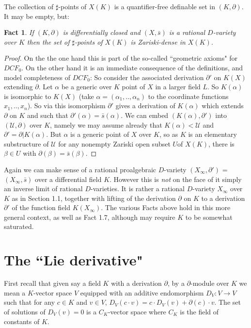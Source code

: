\documentclass[12pt]{article}
\newtheorem{Fact}[Theorem]{Fact}
\begin{document}
The collection of ${\sharp}$-points of $X(K)$ is a quantifier-free definable set in $(K,\partial)$. It may be empty, but:
\begin{Fact}  If $(K,\partial)$ is differentially closed and $(X,{\bar s})$ is a rational $D$-variety over $K$ then the set of $\sharp$-points of $X(K)$ is Zariski-dense in $X(K)$. 
\end{Fact} 
\begin{proof} On the the one hand this is part of the so-called ``geometric axioms" for $DCF_{0}$. On the other hand it is an immediate consequence of the definitions, and model completeness of
 $DCF_{0}$:
So consider the associated derivation $\partial '$ on $K(X)$ extending $\partial$. Let  $\alpha$ be a generic over $K$ point of $X$ in a larger field $L$. So $K(\alpha)$ is isomorphic to $K(X)$ (take $\alpha = (\alpha_{1},..,\alpha_{n})$ to the coordinate functions $x_{1},..,x_{n}$). So  via this isomorphism $\partial '$ gives a derivation of $K(\alpha)$  which extends $\partial$ on $K$ and such that $\partial '(\alpha) = {\bar s}(\alpha)$. 
We can embed $(K(\alpha),\partial ')$ into $({\mathcal U},\partial)$ over $K$, namely we may assume already that $K(\alpha) < {\mathcal U}$ and ${\partial} ' = \partial |K(\alpha)$.
 But $\alpha$ is a generic point of $X$ over $K$, so as $K$ is an elementary substructure of ${\mathcal U}$ for any nonempty Zariski open subset $U$of $X(K)$, there is $\beta \in U$ with $\partial(\beta) = {\bar s}(\beta)$. 

\end{proof} 

Again we can make sense of a rational proalgebraic $D$-variety  $(X_{\infty},\partial ')$ = $(X_{\infty}, {\bar s})$ over a differential field $K$. However this is {\em not} on the face of it simply an inverse limit of rational $D$-varieties. It is 
rather a rational $D$-variety $X_{\infty}$ over $K$ as in Section 1.1, together with lifting of the derivation $\partial$ on $K$ to a derivation $\partial '$ of the function field $K(X_{\infty})$.  The various Facts above hold in this more general 
context, as well as Fact 1.7, although may require $K$ to be somewhat saturated.

\section{The ``Lie derivative"}

First recall that given say a field $K$ with a derivation $\partial$, by a $\partial$-module over $K$ we mean a $K$-vector space $V$ equipped with an additive endomorphism $D_{V}: V\to V$ such that for any $c\in K$ and $v\in V$,
$D_{V}(c\cdot v) = c\cdot D_{V}(v) + \partial (c)\cdot v$. The set of solutions of $D_{V}(v) = 0$ is a $C_{K}$-vector space where $C_{K}$ is the field of constants of $K$. 
\end{document}
